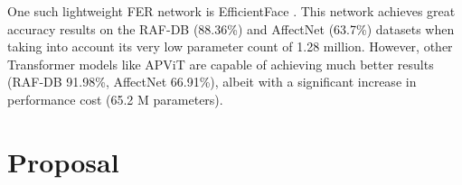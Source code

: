 \documentclass[../main.tex]{subfiles}
\begin{document}
One such lightweight FER network is EfficientFace \cite{eff-face2021}.
This network achieves great accuracy results on the RAF-DB (88.36\%) and AffectNet (63.7\%) datasets when taking into account its very low parameter count of 1.28 million.
However, other Transformer models like APViT \cite{apvit2023} are capable of achieving much better results (RAF-DB 91.98\%, AffectNet 66.91\%), albeit with a significant increase in performance cost (65.2 M parameters).




\section{Proposal} \label{c3:proposal}
\end{document}
